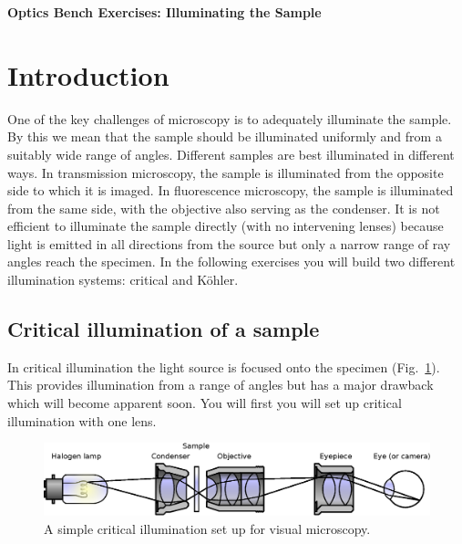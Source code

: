 \documentclass[a4paper]{report}
\begin{document}
\setcounter{secnumdepth}{2}

\begin{center}
\textbf{\Large{Optics Bench Exercises: Illuminating the Sample}}
\end{center}

\section{Introduction}
One of the key challenges of microscopy is to adequately illuminate the sample. 
By this we mean that the sample should be illuminated uniformly and from a suitably wide range of angles. 
Different samples are best illuminated in different ways.
In transmission microscopy, the sample is illuminated from the opposite side to which it is imaged. 
In fluorescence microscopy, the sample is illuminated from the same side, with the objective also serving as the condenser. 
It is not efficient to illuminate the sample directly (with no intervening lenses) because light is emitted in all directions from the source but only a narrow range of ray angles reach the specimen. 
In the following exercises you will build two different illumination systems: critical and K\"{o}hler. 


\subsection{Critical illumination of a sample}
In critical illumination the light source is focused onto the specimen (Fig.~\ref{critIlum}).
This provides illumination from a range of angles but has a major drawback which will become apparent soon. 
You will first you will set up critical illumination with one lens.

\begin{figure}[h]
\center
\includegraphics[width=5in]{Critical_Illumination.eps}
\caption{A simple critical illumination set up for visual microscopy.}
\label{critIlum}
\end{figure}
\end{document}
